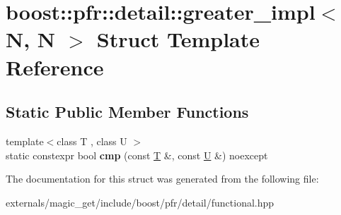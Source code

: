 \hypertarget{structboost_1_1pfr_1_1detail_1_1greater__impl_3_01_n_00_01_n_01_4}{}\section{boost\+:\+:pfr\+:\+:detail\+:\+:greater\+\_\+impl$<$ N, N $>$ Struct Template Reference}
\label{structboost_1_1pfr_1_1detail_1_1greater__impl_3_01_n_00_01_n_01_4}
\subsection*{Static Public Member Functions}
\begin{DoxyCompactItemize}
\item 
\mbox{\label{structboost_1_1pfr_1_1detail_1_1greater__impl_3_01_n_00_01_n_01_4_a0a4b1dda9dd411f5f157c22c32059590}} 
{\footnotesize template$<$class T , class U $>$ }\\static constexpr bool {\bfseries cmp} (const \mbox{\hyperlink{struct_t}{T}} \&, const \mbox{\hyperlink{union_u}{U}} \&) noexcept
\end{DoxyCompactItemize}


The documentation for this struct was generated from the following file\+:\begin{DoxyCompactItemize}
\item 
externals/magic\+\_\+get/include/boost/pfr/detail/functional.\+hpp\end{DoxyCompactItemize}
